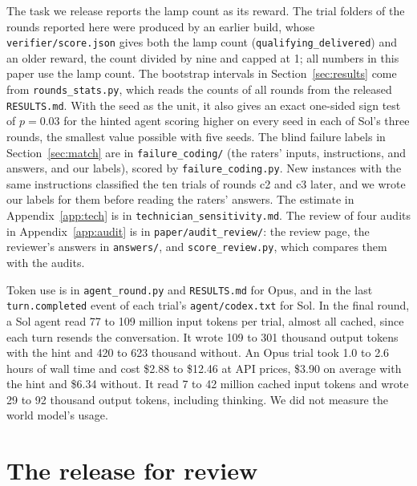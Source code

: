 \documentclass[10pt]{article}
\newif\ifanonymous
\begin{document}
The task we release reports the lamp count as its reward. The trial folders of the rounds reported here were produced by an earlier build, whose \texttt{verifier/score.json} gives both the lamp count (\texttt{qualifying\_delivered}) and an older reward, the count divided by nine and capped at 1; all numbers in this paper use the lamp count. The bootstrap intervals in Section~\ref{sec:results} come from \texttt{rounds\_stats.py}, which reads the counts of all rounds from
the released \texttt{RESULTS.md}. With the seed as the unit, it also gives an exact one-sided sign test of $p = 0.03$ for the hinted
agent scoring higher on every seed in each of Sol's three rounds, the smallest value possible with five seeds. The blind failure
labels in Section~\ref{sec:match} are in \texttt{failure\_coding/} (the raters' inputs, instructions, and answers, and our labels),
scored by \texttt{failure\_coding.py}. New instances with the same instructions classified the ten trials of rounds c2 and c3 later, and
we wrote our labels for them before reading the raters' answers. The estimate in Appendix~\ref{app:tech} is in
\texttt{technician\_sensitivity.md}. The review of four audits in Appendix~\ref{app:audit} is in \texttt{paper/audit\_review/}: the
review page, the reviewer's answers in \texttt{answers/}, and \texttt{score\_review.py}, which compares them with the audits.

Token use is in \texttt{agent\_round.py} and \texttt{RESULTS.md} for Opus, and in the last \texttt{turn.completed} event of each
trial's \texttt{agent/codex.txt} for Sol. In the final round, a Sol agent read 77 to 109 million input tokens per trial, almost all
cached, since each turn resends the conversation. It wrote 109 to 301 thousand output tokens with the hint and 420 to 623 thousand
without. An Opus trial took 1.0 to 2.6 hours of wall time and cost \$2.88 to \$12.46 at API prices, \$3.90 on average with the
hint and \$6.34 without. It read 7 to 42 million cached input tokens and wrote 29 to 92 thousand output tokens, including thinking.
We did not measure the world model's usage.

\ifanonymous
\section{The release for review}
\label{app:release}
\end{document}
